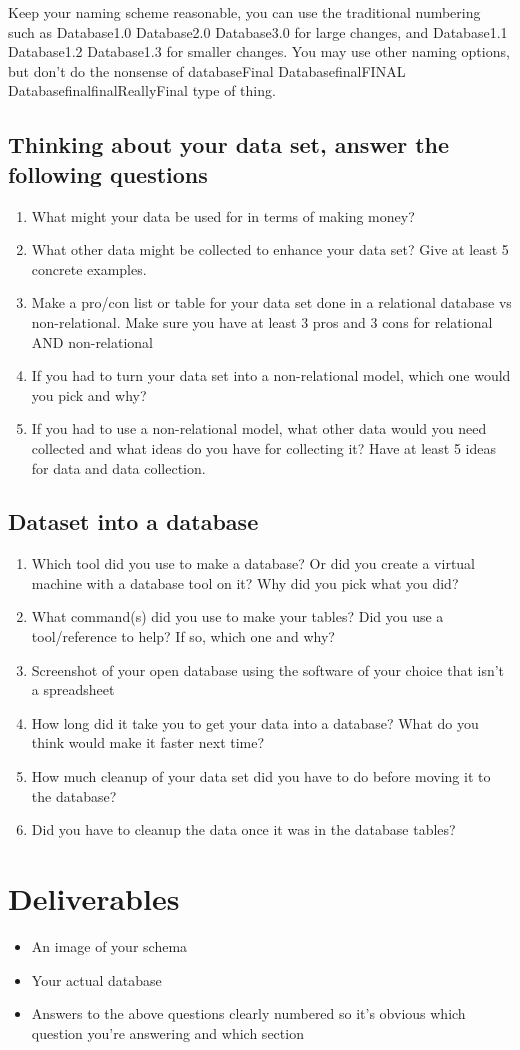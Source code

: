 \documentclass[12pt]{article}
\begin{document}
Keep your naming scheme reasonable, you can use the traditional numbering such as Database1.0 Database2.0 Database3.0 for large changes, and Database1.1  Database1.2 Database1.3 for smaller changes. You may use other naming options, but don't do the nonsense of databaseFinal  DatabasefinalFINAL DatabasefinalfinalReallyFinal type of thing.  

\subsection*{Thinking about your data set, answer the following questions}
    \begin{enumerate}
        \item What might your data be used for in terms of making money?
        \item What other data might be collected to enhance your data set? Give at least 5 concrete examples.
        \item Make a pro/con list or table for your data set done in a relational database vs non-relational.  Make sure you have at least 3 pros and 3 cons for relational AND non-relational
        \item If you had to turn your data set into a non-relational model, which one would you pick and why?
        \item If you had to use a non-relational model, what other data would you need collected and what ideas do you have for collecting it?  Have at least 5 ideas for data and data collection. 
    \end{enumerate}

\subsection*{Dataset into a database}
    \begin{enumerate}
        \item Which tool did you use to make a database? Or did you create a virtual machine with a database tool on it? Why did you pick what you did?
        \item What command(s) did you use to make your tables? Did you use a tool/reference to help? If so, which one and why?
        \item Screenshot of your open database using the software of your choice that isn't a spreadsheet
        \item How long did it take you to get your data into a database? What do you think would make it faster next time?
        \item How much cleanup of your data set did you have to do before moving it to the database?
        \item Did you have to cleanup the data once it was in the database tables?
    \end{enumerate}



\section*{Deliverables}
\begin{itemize}
    \item An image of your schema
    \item Your actual database
    \item Answers to the above questions clearly numbered so it's obvious which question you're answering and which section
\end{itemize}
\end{document}
